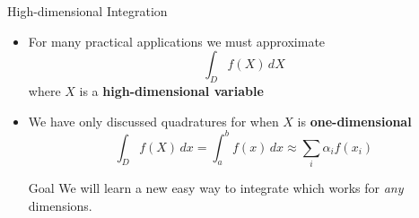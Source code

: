 \documentclass[10pt]{beamer}
\begin{document}
\begin{frame}{High-dimensional Integration}

\begin{itemize}
    \item For many practical applications we must approximate 
        $$\int_D  f(X)\,dX $$
        where $X$ is a \textbf{high-dimensional variable}\\[5mm]

    \item We have only discussed quadratures for when $X$ is \textbf{one-dimensional }
        $$ \int_D f(X)\,dx = \int_a^b f(x)\,dx \approx \sum_i \alpha_i f(x_i)$$

    \begin{block}{Goal}
        We will learn a new easy way to integrate which works for \textit{any} dimensions.
    \end{block}
\end{itemize}
    
\end{frame}
\end{document}
